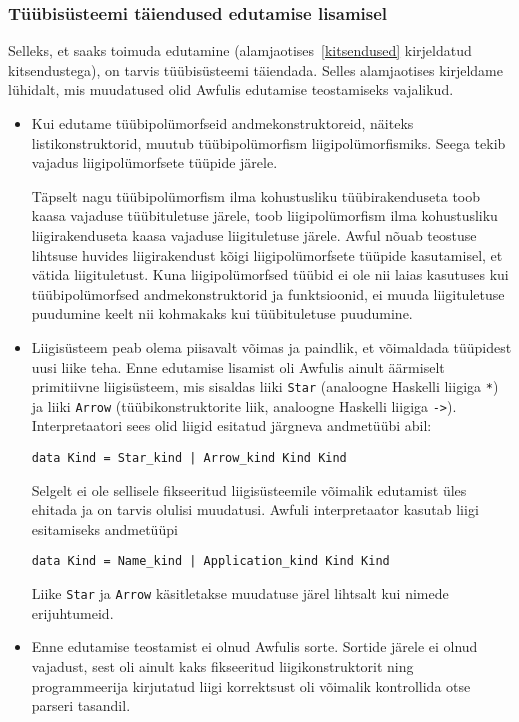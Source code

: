 \documentclass[12pt]{article}
\begin{document}
      \subsubsection{Tüübisüsteemi täiendused edutamise lisamisel}
        Selleks, et saaks toimuda edutamine (alamjaotises~\ref{kitsendused} kirjeldatud kitsendustega), on tarvis tüübisüsteemi täiendada. Selles alamjaotises kirjeldame lühidalt, mis muudatused olid Awfulis edutamise teostamiseks vajalikud.

        \begin{itemize}
          \item
            Kui edutame tüübipolümorfseid andmekonstruktoreid, näiteks listikonstruktorid, muutub tüübipolümorfism liigipolümorfismiks. Seega tekib vajadus liigipolümorfsete tüüpide järele.

            Täpselt nagu tüübipolümorfism ilma kohustusliku tüübirakenduseta toob kaasa vajaduse tüübituletuse järele, toob liigipolümorfism ilma kohustusliku liigirakenduseta kaasa vajaduse liigituletuse järele. Awful nõuab teostuse lihtsuse huvides liigirakendust kõigi liigipolümorfsete tüüpide kasutamisel, et vätida liigituletust. Kuna liigipolümorfsed tüübid ei ole nii laias kasutuses kui tüübipolümorfsed andmekonstruktorid ja funktsioonid, ei muuda liigituletuse puudumine keelt nii kohmakaks kui tüübituletuse puudumine.
          \item
            Liigisüsteem peab olema piisavalt võimas ja paindlik, et võimaldada tüüpidest uusi liike teha. Enne edutamise lisamist oli Awfulis ainult äärmiselt primitiivne liigisüsteem, mis sisaldas liiki \verb!Star! (analoogne Haskelli liigiga \verb!*!) ja liiki \verb!Arrow! (tüübikonstruktorite liik, analoogne Haskelli liigiga \verb!->!). Interpretaatori sees olid liigid esitatud järgneva andmetüübi abil:

            \begin{verbatim}data Kind = Star_kind | Arrow_kind Kind Kind\end{verbatim}

            Selgelt ei ole sellisele fikseeritud liigisüsteemile võimalik edutamist üles ehitada ja on tarvis olulisi muudatusi. Awfuli interpretaator kasutab liigi esitamiseks andmetüüpi

            \begin{verbatim}data Kind = Name_kind | Application_kind Kind Kind\end{verbatim}

            Liike \verb!Star! ja \verb!Arrow! käsitletakse muudatuse järel lihtsalt kui nimede erijuhtumeid.
          \item
            Enne edutamise teostamist ei olnud Awfulis sorte. Sortide järele ei olnud vajadust, sest oli ainult kaks fikseeritud liigikonstruktorit ning programmeerija kirjutatud liigi korrektsust oli võimalik kontrollida otse parseri tasandil.


\end{itemize}
\end{document}
